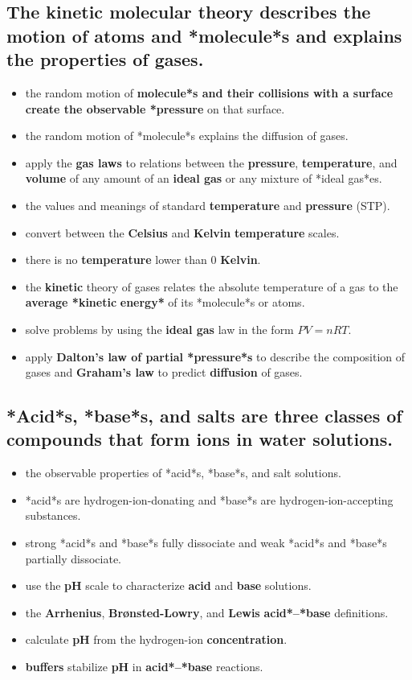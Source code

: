 \documentclass[11pt]{article}
\begin{document}
\subsection{The \textbf{kinetic} molecular theory describes the motion of atoms and *molecule*s and explains the properties of gases.}
\label{sec:orgc1b0d46}

\begin{itemize}
\item the random motion of \textbf{molecule*s and their collisions with a surface create the observable *pressure} on that surface.
\item the random motion of *molecule*s explains the diffusion of gases.

\item apply the \textbf{gas laws} to relations between the \textbf{pressure}, \textbf{temperature}, and \textbf{volume} of any amount of an \textbf{ideal gas} or any mixture of *ideal gas*es.
\item the values and meanings of standard \textbf{temperature} and \textbf{pressure} (STP).
\item convert between the \textbf{Celsius} and \textbf{Kelvin} \textbf{temperature} scales.
\item there is no \textbf{temperature} lower than 0 \textbf{Kelvin}.
\item the \textbf{kinetic} theory of gases relates the absolute temperature of a gas to the \textbf{average *kinetic} \textbf{energy*} of its *molecule*s or atoms.
\item solve problems by using the \textbf{ideal gas} law in the form \(PV = nRT\).
\item apply \textbf{Dalton’s law of partial *pressure*s} to describe the composition of gases and \textbf{Graham’s law} to predict \textbf{diffusion} of gases.
\end{itemize}
\subsection{*Acid*s, *base*s, and salts are three classes of compounds that form ions in water solutions.}
\label{sec:orgf474de6}

\begin{itemize}
\item the observable properties of *acid*s, *base*s, and salt solutions.
\item *acid*s are hydrogen-ion-donating and *base*s are hydrogen-ion-accepting substances.
\item strong *acid*s and *base*s fully dissociate and weak *acid*s and *base*s partially dissociate.
\item use the \textbf{pH} scale to characterize \textbf{acid} and \textbf{base} solutions.
\item the \textbf{Arrhenius}, \textbf{Brønsted-Lowry}, and \textbf{Lewis} \textbf{acid*–*base} definitions.
\item calculate \textbf{pH} from the hydrogen-ion \textbf{concentration}.
\item \textbf{buffers} stabilize \textbf{pH} in \textbf{acid*–*base} reactions.
\end{itemize}
\end{document}
